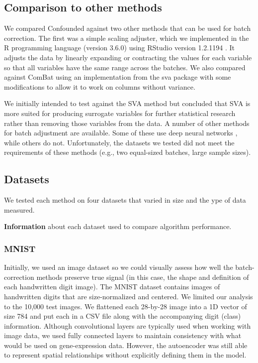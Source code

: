\documentclass[11pt]{article}
\begin{document}
\subsection{Comparison to other methods}

We compared Confounded against two other methods that can be used for batch correction. The first was a simple scaling adjuster,
which we implemented in the R programming language (version 3.6.0) \citep{r_core_team_r_2014} using RStudio version 1.2.1194 \citep{rstudio_team_rstudio_2018}.
It adjusts the data by linearly expanding or contracting the values for each variable so that all variables have the same range across the batches.
We also compared against ComBat \citep{johnson_adjusting_2007} using an implementation from the sva package \citep{leek_sva_2017} with some modifications to allow it to work on columns without variance.

We initially intended to test against the SVA \citep{leek_capturing_2007} method but concluded that SVA is more suited for producing surrogate variables for further statistical research rather than removing those variables from the data.
A number of other methods for batch adjustment are available. Some of these use deep neural networks \citep{shaham_removal_2017,shaham_batch_2018,upadhyay_removal_2019}, while others do not\citep{espin-perez_comparison_2018}.
Unfortunately, the datasets we tested did not meet the requirements of these methods (e.g., two equal-sized batches, large sample sizes).

\subsection{Datasets}

We tested each method on four datasets that varied in size and the ype of data measured.

\begin{table}
	\centering
	\caption[Dataset information]{
		\textbf{Information} about each dataset used to compare algorithm performance.
	}
	
	\label{tab:datasets}
\end{table}

\subsubsection{MNIST}

Initially, we used an image dataset so we could visually assess how well the batch-correction methods preserve true signal (in this case, the shape and definition of each handwritten digit image).
The MNIST dataset \cite{lecun_mnist_nodate} contains images of handwritten digits that are size-normalized and centered.
We limited our analysis to the 10,000 test images.
We flattened each 28-by-28 image into a 1D vector of size 784 and put each in a CSV file along with the accompanying digit (class) information.
Although convolutional layers are typically used when working with image data, we used fully connected layers to maintain consistency with what would be used on gene-expression data.
However, the autoencoder was still able to represent spatial relationships without explicitly defining them in the model.
\end{document}
